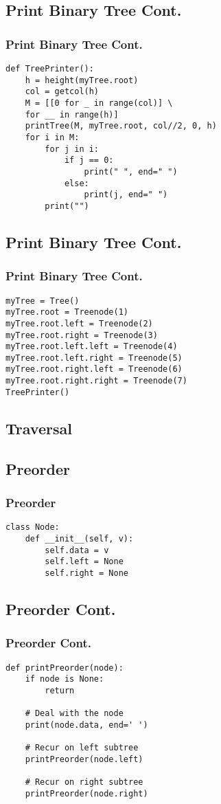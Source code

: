 \documentclass{beamer}
\begin{document}
\begin{frame}[fragile]
\subsection{Print Binary Tree Cont.}
\frametitle{Print Binary Tree Cont.}
\begin{lstlisting}
def TreePrinter():
    h = height(myTree.root)
    col = getcol(h)
    M = [[0 for _ in range(col)] \
    for __ in range(h)]
    printTree(M, myTree.root, col//2, 0, h)
    for i in M:
        for j in i:
            if j == 0:
                print(" ", end=" ")
            else:
                print(j, end=" ")
        print("")
\end{lstlisting}
\end{frame}


\begin{frame}[fragile]
\subsection{Print Binary Tree Cont.}
\frametitle{Print Binary Tree Cont.}
\begin{lstlisting}
myTree = Tree()
myTree.root = Treenode(1)
myTree.root.left = Treenode(2)
myTree.root.right = Treenode(3)
myTree.root.left.left = Treenode(4)
myTree.root.left.right = Treenode(5)
myTree.root.right.left = Treenode(6)
myTree.root.right.right = Treenode(7)
TreePrinter()
\end{lstlisting}
\end{frame}

\begin{frame}[fragile]
\section{Traversal}
\subsection{Preorder}
\frametitle{Preorder}
\begin{lstlisting}
class Node:
    def __init__(self, v):
        self.data = v
        self.left = None
        self.right = None
\end{lstlisting}
\end{frame}

\begin{frame}[fragile]
\subsection{Preorder Cont.}
\frametitle{Preorder Cont.}
\begin{lstlisting}
def printPreorder(node):
    if node is None:
        return

    # Deal with the node
    print(node.data, end=' ')

    # Recur on left subtree
    printPreorder(node.left)

    # Recur on right subtree
    printPreorder(node.right)\end{lstlisting}
\end{frame}
\end{document}
